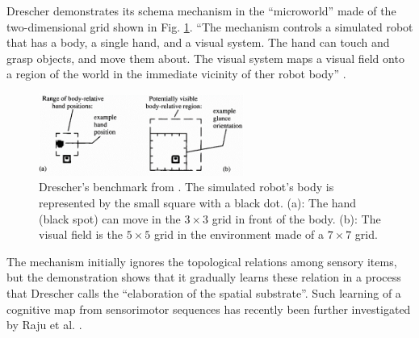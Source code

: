 \documentclass[runningheads]{llncs}
\begin{document}



Drescher demonstrates its schema mechanism in the ``microworld'' made of the two-dimensional grid shown in Fig. \ref{fig:drescher2}.
``The mechanism controls a simulated robot that has a body, a single hand, and a visual system. 
The hand can touch and grasp objects, and move them about.
The visual system maps a visual field onto a region of the world in the immediate vicinity of ther robot body'' \cite[p. 114]{drescher_made-up_1991}. 



\begin{figure}
	\centering
	\includegraphics[width=0.6\textwidth]{Figure_drescher_expe.png}
	\caption{Drescher's benchmark from \cite[Fig. 6.1]{drescher_made-up_1991}. The simulated robot's body is represented by the small square with a black dot. 
		(a): The hand (black spot) can move in the $3 \times 3$ grid in front of the body.
		(b): The visual field is the $5 \times 5$ grid in the environment made of a $7 \times 7$ grid.} 
	\label{fig:drescher2}
\end{figure}

The mechanism initially ignores the topological relations among sensory items, but the demonstration shows that it gradually learns these relation in a process that Drescher calls the ``elaboration of the spatial substrate''. 
Such learning of a cognitive map from sensorimotor sequences has recently been further investigated by Raju et al. \cite{raju_space_2022}.
\end{document}
